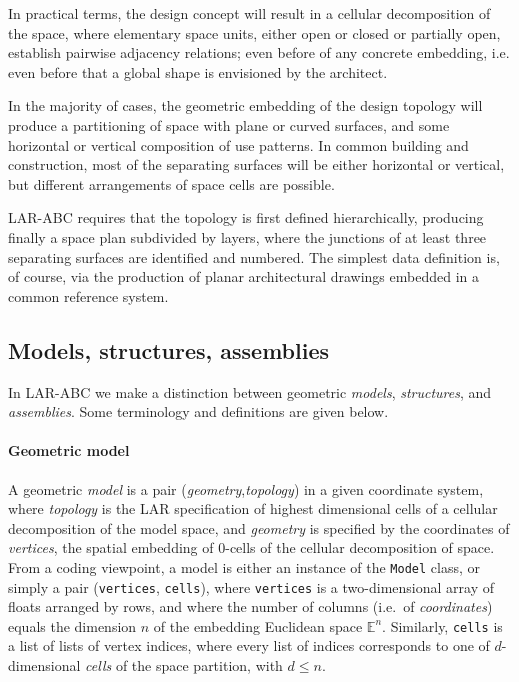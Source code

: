 \documentclass[11pt,oneside]{article}    %
\def\E{\mathbb{E}}
\begin{document}
In practical terms, the design concept will result in a cellular decomposition of the space, where elementary space units, either open or closed or partially open, establish pairwise adjacency relations; even before of any concrete embedding, i.e. even before that a global shape is envisioned by the architect. 

In the majority of cases, the geometric embedding of the design topology will produce a partitioning of space with plane or curved surfaces, and some horizontal or vertical composition of use patterns. In common building and construction, most of the separating surfaces will be either horizontal or vertical, but different arrangements of space cells are possible.

LAR-ABC requires that the topology is first defined hierarchically, producing finally a space plan subdivided by layers, where the junctions of at least three separating surfaces are identified and numbered. The simplest data definition is, of course, via the production of planar architectural drawings embedded in a common reference system.

\subsection{Models, structures, assemblies}

In LAR-ABC we make a distinction between geometric \emph{models}, \emph{structures}, and \emph{assemblies}. Some terminology and definitions are given below.

\paragraph{Geometric model}
A geometric \emph{model} is a pair (\emph{geometry},\emph{topology}) in a given coordinate system, where  \emph{topology} is the LAR specification of highest dimensional cells of a cellular decomposition of the model space, and \emph{geometry} is specified by the coordinates of \emph{vertices}, the spatial embedding of 0-cells of the cellular decomposition of space. From a coding viewpoint, a model is either an instance of the \texttt{Model} class, or simply a pair (\texttt{vertices}, \texttt{cells}), where \texttt{vertices} is a two-dimensional array of floats arranged by rows, and where the number of columns (i.e.~of \emph{coordinates}) equals the dimension $n$ of the embedding Euclidean space $\E^n$. Similarly, \texttt{cells} is a list of lists of vertex indices, where every list of indices corresponds to one of $d$-dimensional \emph{cells} of the space partition, with $d\leq n$.
\end{document}
